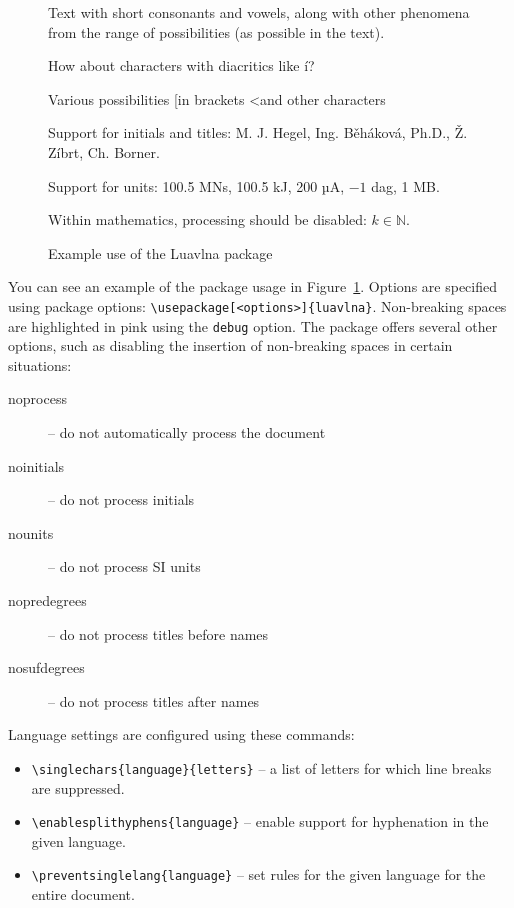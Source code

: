 \documentclass{ltugboat}
\begin{document}
\begin{figure}
  \begin{minipage}{3in}

    \preventsingledebugon

    Text with short consonants and vowels, along with other phenomena from the range of possibilities (as possible in the text).

    How about characters with diacritics like í?

    Various possibilities [in brackets \textless and other characters

    Support for initials and titles: M. J. Hegel, Ing. Běháková, Ph.D., Ž. Zíbrt, Ch. Borner.

    Support for units: 100.5 MN\cdot{}s, 100.5 kJ, 200 µA, $-1$ dag, 1 MB. 

    Within mathematics, processing should be disabled: $k \in \mathbb N$.

    \preventsingledebugoff
  \end{minipage}
  \caption{Example use of the Luavlna package}\label{fig:luavlna}
\end{figure}

You can see an example of the package usage in Figure~\ref{fig:luavlna}.
Options are specified using package options:
\verb|\usepackage[<options>]{luavlna}|. Non-breaking spaces are highlighted in
pink using the \texttt{debug} option. The package offers several other options,
such as disabling the insertion of non-breaking spaces in certain situations:

\begin{description}
  \item [noprocess] – do not automatically process the document
  \item [noinitials] – do not process initials
  \item [nounits] – do not process SI units
  \item [nopredegrees] – do not process titles before names
  \item [nosufdegrees] – do not process titles after names
\end{description}

Language settings are configured using these commands:

\begin{itemize}
  \item\verb|\singlechars{language}{letters}| – a list of letters for which line breaks are suppressed.
  \item\verb|\enablesplithyphens{language}| – enable support for hyphenation in the given language.
  \item\verb|\preventsinglelang{language}| – set rules for the given language for the entire document.
\end{itemize}
\end{document}
